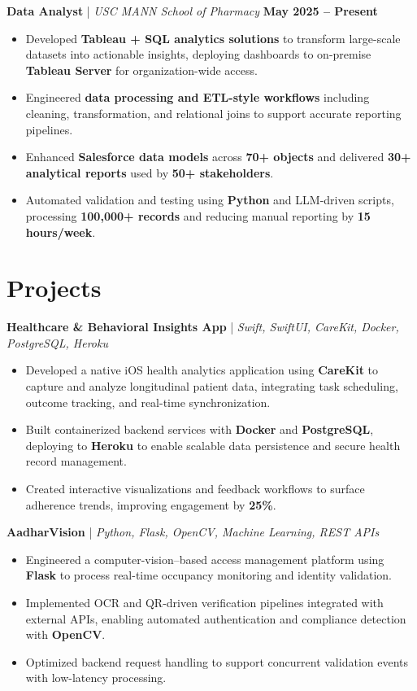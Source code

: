 \documentclass[letterpaper,11pt]{article}
\begin{document}
\textbf{Data Analyst} \;|\; \textit{USC MANN School of Pharmacy} \hfill \textbf{May 2025 -- Present} \\

\begin{itemize}[noitemsep]
    \item Developed \textbf{Tableau + SQL analytics solutions} to transform large-scale datasets into actionable insights, deploying dashboards to on-premise \textbf{Tableau Server} for organization-wide access.
    \item Engineered \textbf{data processing and ETL-style workflows} including cleaning, transformation, and relational joins to support accurate reporting pipelines.
    \item Enhanced \textbf{Salesforce data models} across \textbf{70+ objects} and delivered \textbf{30+ analytical reports} used by \textbf{50+ stakeholders}.
    \item Automated validation and testing using \textbf{Python} and LLM-driven scripts, processing \textbf{100,000+ records} and reducing manual reporting by \textbf{15 hours/week}.
\end{itemize}



\section*{Projects}

\textbf{Healthcare \& Behavioral Insights App} \;|\; \textit{Swift, SwiftUI, CareKit, Docker, PostgreSQL, Heroku} \\
\begin{itemize}[noitemsep]
    \item Developed a native iOS health analytics application using \textbf{CareKit} to capture and analyze longitudinal patient data, integrating task scheduling, outcome tracking, and real-time synchronization.
    \item Built containerized backend services with \textbf{Docker} and \textbf{PostgreSQL}, deploying to \textbf{Heroku} to enable scalable data persistence and secure health record management.
    \item Created interactive visualizations and feedback workflows to surface adherence trends, improving engagement by \textbf{25\%}.
\end{itemize}

\textbf{AadharVision} \;|\; \textit{Python, Flask, OpenCV, Machine Learning, REST APIs} \\
\begin{itemize}[noitemsep]
    \item Engineered a computer-vision–based access management platform using \textbf{Flask} to process real-time occupancy monitoring and identity validation.
    \item Implemented OCR and QR-driven verification pipelines integrated with external APIs, enabling automated authentication and compliance detection with \textbf{OpenCV}.
    \item Optimized backend request handling to support concurrent validation events with low-latency processing.
\end{itemize}
\end{document}
